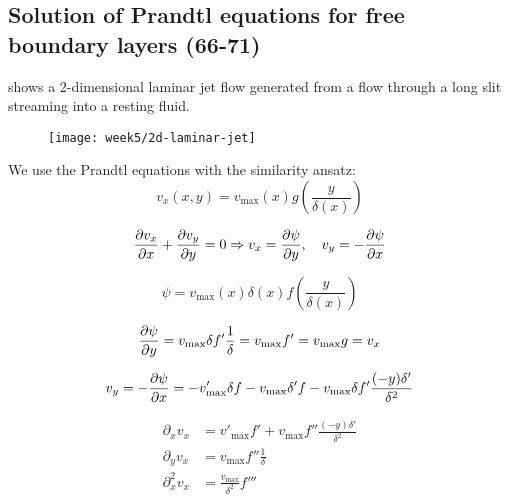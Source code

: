 \subsection{Solution of Prandtl equations for free boundary layers (66-71)} 

 shows a 2-dimensional laminar jet flow generated from a flow through a long slit streaming into a resting fluid.

\begin{figure}[!h]
    \centering
    \texttt{[image: week5/2d-laminar-jet]}\\
    \caption{}
    \label{fig:2d-laminar-jet}
\end{figure}

We use the Prandtl equations with the similarity ansatz:
\begin{equation}
v_x(x,y)=v_\mathrm{max}(x)g\left(\frac{y}{\delta(x)}\right)
\end{equation}

\begin{equation}
\frac{\partial v_x}{\partial x}+\frac{\partial v_y}{\partial y}=0 \Rightarrow v_x=\frac{\partial \psi}{\partial y},\quad v_y=-\frac{\partial \psi}{\partial x}
\end{equation}

\begin{equation}
\psi = v_\mathrm{max}(x)\delta(x)f\left(\frac{y}{\delta(x)}\right)
\end{equation}

\begin{equation}
\frac{\partial \psi}{\partial y}=v_\mathrm{max}\delta f'\frac{1}{\delta}=v_\mathrm{max}f'=v_\mathrm{max}g=v_x
\end{equation}

\begin{equation}
v_y=-\frac{\partial \psi}{\partial x}=-v'_\mathrm{max}\delta f-v_\mathrm{max}\delta'f-v_\mathrm{max}\delta f'\frac{(-y)\delta'}{\delta^2}
\end{equation}

\begin{align}
\partial_xv_x &= v'_\mathrm{max}f'+v_\mathrm{max}f''\frac{(-y)\delta'}{\delta^2} \\
\partial_yv_x &= v_\mathrm{max} f''\frac{1}{\delta}\\
\partial^2_xv_x &= \frac{v_\mathrm{max}}{\delta^2}f'''
\end{align}

